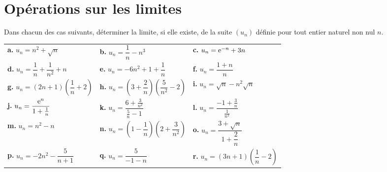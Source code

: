 \documentclass[11pt,fleqn]{book} %
\begin{document}

\section*{Opérations sur les limites}

\begin{exercise}[topic=lim02] Dans chacun des cas suivants, déterminer la limite, si elle existe, de la suite $(u_n)$  définie pour tout entier naturel non nul $n$.

\renewcommand{\arraystretch}{2.5}
\begin{tabularx}{\linewidth}{XXX}
\textbf{a.}  $u_n= n^2+\sqrt{n}$ & \textbf{b.} $u_n = \dfrac{1}{n}-n^3$ & \textbf{c.} $u_n = \mathrm{e}^{-n}+3n$ \\
\textbf{d.} $u_n = \dfrac{1}{n} + \dfrac{1}{n^2}+n$ & \textbf{e.} $ u_n =-6n^2+1+ \dfrac{1}{n}$ & \textbf{f.} $u_n=\dfrac{1+n}{n}$\\
\textbf{g.} $u_n = (2n+1)\left(\dfrac{1}{	n}+2\right)$ & \textbf{h.} $ u_n = \left(3+\dfrac{2}{n}\right) \left( \dfrac{5}{n^2}-2\right)$ & \textbf{i.} $u_n=\sqrt{n}-n^2\sqrt{n}$\\
\textbf{j.} $ u_n = \dfrac{\mathrm{e}^n}{1+\frac{1}{n}}$ & \textbf{k.} $ u_n = \dfrac{6+\frac{3}{n^2}}{\frac{5}{n}-1}$ &
\textbf{l.} $ u_n = \dfrac{-1+\frac{3}{n}}{\frac{1}{n^2}}$ \\

\textbf{m.} $u_n=n^2-n$ & \textbf{n.} $u_n=\left(1-\dfrac{1}{n}\right)\left(2+\dfrac{3}{n^2}\right)$ & 
\textbf{o.} $u_n=\dfrac{3+\sqrt{n}}{1+\dfrac{2}{n}}$\\
\textbf{p.} $u_n=-2n^2-\dfrac{5}{n+1}$ & \textbf{q.} $u_n=\dfrac{5}{-1-n}$ & \textbf{r.} $u_n = (3n+1)\left(\dfrac{1}{n}-2\right)$
\end{tabularx}
\end{exercise}
\end{document}
